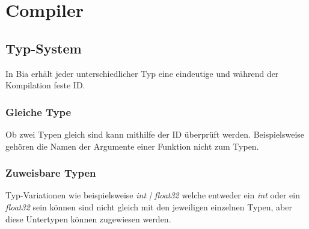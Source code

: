 \chapter{Compiler}

\section{Typ-System}
In Bia erhält jeder unterschiedlicher Typ eine eindeutige und während der Kompilation feste ID.

\subsection{Gleiche Type}
Ob zwei Typen gleich sind kann mithilfe der ID überprüft werden. Beispielsweise gehören die Namen der Argumente einer Funktion nicht zum Typen.

\subsection{Zuweisbare Typen}
Typ-Variationen wie beispielsweise \textit{int | float32} welche entweder ein \textit{int} oder ein \textit{float32} sein können sind nicht gleich mit den jeweiligen einzelnen Typen, aber diese Untertypen können zugewiesen werden.